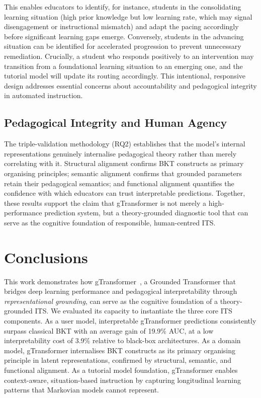 \documentclass[runningheads]{llncs}
\begin{document}
This enables educators to identify, for instance, students in the consolidating learning situation (high prior knowledge but low learning rate, which may signal disengagement or instructional mismatch) and adapt the pacing accordingly before significant learning gaps emerge. Conversely, students in the advancing situation can be identified for accelerated progression to prevent unnecessary remediation. Crucially, a student who responds positively to an intervention may transition from a foundational learning situation to an emerging one, and the tutorial model will update its routing accordingly. This intentional, responsive design addresses essential concerns about accountability and pedagogical integrity in automated instruction.

\subsection{Pedagogical Integrity and Human Agency}

The triple-validation methodology (RQ2) establishes that the model's internal representations genuinely internalise pedagogical theory rather than merely correlating with it. Structural alignment confirms BKT constructs as primary organising principles; semantic alignment confirms that grounded parameters retain their pedagogical semantics; and functional alignment quantifies the confidence with which educators can trust interpretable predictions. Together, these results support the claim that gTransformer is not merely a high-performance prediction system, but a theory-grounded diagnostic tool that can serve as the cognitive foundation of responsible, human-centred ITS.

%
\section{Conclusions}

This work demonstrates how gTransformer~\cite{labra2026theory}, a Grounded Transformer that bridges deep learning performance and pedagogical interpretability through \textit{representational grounding}, can serve as the cognitive foundation of a theory-grounded ITS. We evaluated its capacity to instantiate the three core ITS components. As a user model, interpretable gTransformer predictions consistently surpass classical BKT with an average gain of 19.9\% AUC, at a low interpretability cost of 3.9\% relative to black-box architectures. As a domain model, gTransformer internalises BKT constructs as its primary organising principle in latent representations, confirmed by structural, semantic, and functional alignment. As a tutorial model foundation, gTransformer enables context-aware, situation-based instruction by capturing longitudinal learning patterns that Markovian models cannot represent.
\end{document}
